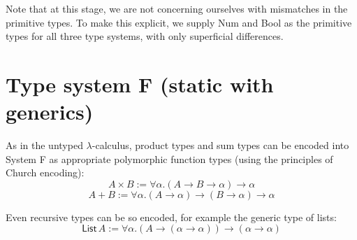 \documentclass[11pt]{article}
\begin{document}
Note that at this stage, we are not concerning ourselves with mismatches in the primitive types. 
To make this explicit, we supply \textsf{Num} and \textsf{Bool} as the primitive types for all three type systems, with only superficial differences.

\section{Type system F (static with generics)}


As in the untyped $\lambda$-calculus, product types and sum types can be encoded into System F as appropriate polymorphic function types (using the principles of Church encoding):
\[A \times B := \forall \alpha. (A \rightarrow B \rightarrow \alpha) \rightarrow \alpha\]
\[A + B := \forall \alpha. (A \rightarrow \alpha) \rightarrow (B \rightarrow \alpha) \rightarrow \alpha\]

Even recursive types can be so encoded, for example the generic type of lists:
\[\textsf{List}\,A := \forall \alpha. \left(A \rightarrow \left(\alpha \rightarrow \alpha\right)\right) \rightarrow \left(\alpha \rightarrow \alpha\right)\]
\end{document}
